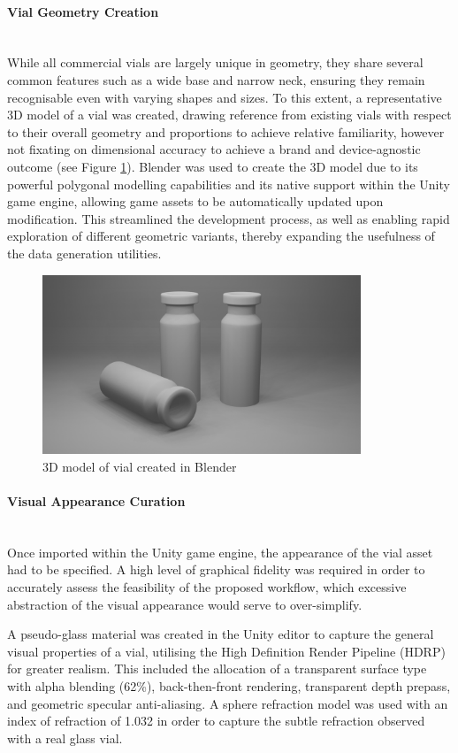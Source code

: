 \documentclass[10pt]{article}
\newcommand{\subsubsubsection}[1]{\paragraph{#1}\mbox{}\\}
\begin{document}
\subsubsubsection{Vial Geometry Creation}
While all commercial vials are largely unique in geometry, they share several common features such as a wide base and narrow neck, ensuring they remain recognisable even with varying shapes and sizes. To this extent, a representative 3D model of a vial was created, drawing reference from existing vials with respect to their overall geometry and proportions to achieve relative familiarity, however not fixating on dimensional accuracy to achieve a brand and device-agnostic outcome (see Figure \ref{fig:vial_geometry}). Blender was used to create the 3D model due to its powerful polygonal modelling capabilities and its native support within the Unity game engine, allowing game assets to be automatically updated upon modification. This streamlined the development process, as well as enabling rapid exploration of different geometric variants, thereby expanding the usefulness of the data generation utilities.

\vfill
\begin{figure}[hbt]
\centering
\includegraphics[width=0.85\textwidth]{images/Vial_Geometry.png}
\caption{3D model of vial created in Blender}
\label{fig:vial_geometry}
\end{figure}
\vfill

\clearpage

\subsubsubsection{Visual Appearance Curation}
Once imported within the Unity game engine, the appearance of the vial asset had to be specified. A high level of graphical fidelity was required in order to accurately assess the feasibility of the proposed workflow, which excessive abstraction of the visual appearance would serve to over-simplify.

A pseudo-glass material was created in the Unity editor to capture the general visual properties of a vial, utilising the High Definition Render Pipeline (HDRP) for greater realism. This included the allocation of a transparent surface type with alpha blending (62\%), back-then-front rendering, transparent depth prepass, and geometric specular anti-aliasing. A sphere refraction model was used with an index of refraction of 1.032 in order to capture the subtle refraction observed with a real glass vial. 
\end{document}

